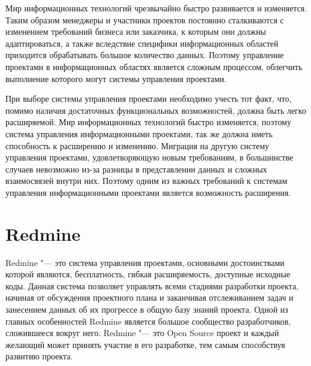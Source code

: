 Мир информационных технологий чрезвычайно быстро развивается и изменяется.
Таким образом менеджеры и участники проектов постоянно сталкиваются с
изменением требований бизнеса или заказчика, к которым они должны
адаптироваться, а также вследствие специфики информационных областей
приходится обрабатывать большое количество данных. Поэтому управление проектами в
информационных областях является сложным процессом, облегчить выполнение
которого могут системы управления проектами.

При выборе системы управления проектами необходимо учесть тот факт, что, помимо
наличия достаточных функциональных возможностей, должна быть легко расширяемой.
Мир информационных технологий быстро изменяется, поэтому система управления
информационными проектами, так же должна иметь способность к расширению и
изменению. Миграция на другую систему управления проектами, удовлетворяющую
новым требованиям, в большинстве случаев невозможно из-за разницы в
представлении данных и сложных взаимосвязей внутри них. Поэтому одним из важных
требований к системам управления информационными проектами является возможность
расширения.

\section{Redmine}
Redmine "--- это система управления проектами, основными достоинствами которой
являются, бесплатность, гибкая расширяемость, доступные исходные коды.
Данная система позволяет управлять всеми стадиями разработки проекта, начиная
от обсуждения проектного плана и заканчивая отслеживанием задач и занесением
данных об их прогрессе в общую базу знаний проекта. Одной из главных
особенностей Redmine является большое сообщество разработчиков, сложившееся
вокруг него. Redmine "--- это Open Source проект и каждый желающий может принять
участие в его разработке, тем самым способствуя развитию проекта.

